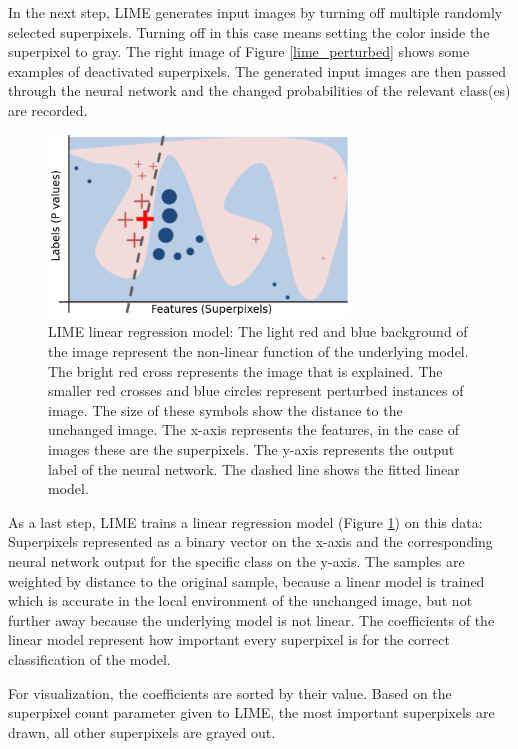In the next step, LIME generates input images by turning off multiple randomly selected superpixels. Turning off in this case means setting the color inside the superpixel to gray. The right image of Figure \ref{lime_perturbed} shows some examples of deactivated superpixels. The generated input images are then passed through the neural network and the changed probabilities of the relevant class(es) are recorded.

\begin{figure}[H]
\centering
\includegraphics[width=8cm]{chapters/02_methods/images/lime2.png}
\caption{LIME linear regression model: The light red and blue background of the image represent the non-linear function of the underlying model.
The bright red cross represents the image that is explained. The smaller red crosses and blue circles represent
perturbed instances of image. The size of these symbols show the distance to the unchanged image. The x-axis represents the features, in the case of images these are the superpixels. The y-axis represents the output label of the neural network. The dashed line shows the fitted linear model.}
\label{lime_linear_regression}
\end{figure}

As a last step, LIME trains a linear regression model (Figure \ref{lime_linear_regression}) on this data: Superpixels represented as a binary vector on the x-axis and the corresponding neural network output for the specific class on the y-axis. The samples are weighted by distance to the original sample, because a linear model is trained which is accurate in the local environment of the unchanged image, but not further away because the underlying model is not linear. The coefficients of the linear model represent how important every superpixel is for the correct classification of the model.

For visualization, the coefficients are sorted by their value. Based on the superpixel count parameter given to LIME, the most important superpixels are drawn, all other superpixels are grayed out. 

